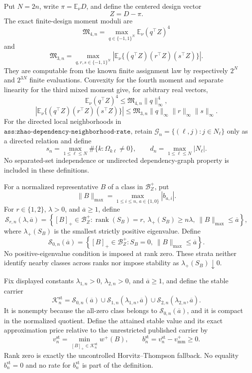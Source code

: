 Put \(N=2n\), write \(\pi=\mathbb E_\nu D\), and define the centered design vector
\[
Z=D-\pi.
\]
The exact finite-design moment moduli are
\[
\mathfrak M_{4,n}
=\max_{q\in\{-1,1\}^{N}}\mathbb E_\nu(q^{\top}Z)^4
\]
and
\[
\mathfrak M_{3,n}
=\max_{q,r,s\in\{-1,1\}^{N}}
\left|\mathbb E_\nu\{(q^{\top}Z)(r^{\top}Z)(s^{\top}Z)\}\right|.
\]
They are computable from the known finite assignment law by respectively \(2^N\) and \(2^{3N}\) finite evaluations.  Convexity for the fourth moment and separate linearity for the third mixed moment give, for arbitrary real vectors,
\[
\mathbb E_\nu(q^{\top}Z)^4
\le\mathfrak M_{4,n}\lVert q\rVert_\infty^4,
\]
\[
\left|\mathbb E_\nu\{(q^{\top}Z)(r^{\top}Z)(s^{\top}Z)\}\right|
\le\mathfrak M_{3,n}\lVert q\rVert_\infty
\lVert r\rVert_\infty\lVert s\rVert_\infty.
\]
For the directed local neighborhoods in \(\texttt{ass:zhao-dependency-neighborhood-rate}\), retain \(\mathcal G_n=\{(\ell,j):j\in N_\ell\}\) only as a directed relation and define
\[
s_n=\max_{1\le \ell\le N}\#\{k:\Omega_{k\ell}\ne0\},
\qquad
d_n=\max_{1\le \ell\le N}\lvert N_\ell\rvert.
\]
No separated-set independence or undirected dependency-graph property is included in these definitions.

For a normalized representative \(B\) of a class in \(\mathcal B_Z^+\), put
\[
\lVert B\rVert_{\max}
=\max_{1\le i\le n,\,a\in\{1,0\}}|b_{a,i}|.
\]
For \(r\in\{1,2\}\), \(\lambda>0\), and \(\overline a\ge1\), define
\[
\mathcal S_{r,n}(\lambda,\overline a)
=\left\{[B]_+\in\mathcal B_Z^+:
\operatorname{rank}(S_B)=r,\ 
\lambda_+(S_B)\ge n\lambda,\ 
\lVert B\rVert_{\max}\le\overline a\right\},
\]
where \(\lambda_+(S_B)\) is the smallest strictly positive eigenvalue.  Define
\[
\mathcal S_{0,n}(\overline a)
=\left\{[B]_+\in\mathcal B_Z^+:S_B=0,\ 
\lVert B\rVert_{\max}\le\overline a\right\}.
\]
No positive-eigenvalue condition is imposed at rank zero.  These strata neither identify nearby classes across ranks nor impose stability as \(\lambda_+(S_B)\downarrow0\).

Fix displayed constants \(\lambda_{1,n}>0\), \(\lambda_{2,n}>0\), and \(\overline a\ge1\), and define the stable carrier
\[
\mathcal K_n^{\mathrm{st}}
=\mathcal S_{0,n}(\overline a)
\cup\mathcal S_{1,n}(\lambda_{1,n},\overline a)
\cup\mathcal S_{2,n}(\lambda_{2,n},\overline a).
\]
It is nonempty because the all-zero class belongs to \(\mathcal S_{0,n}(\overline a)\), and it is compact in the normalized quotient.  Define the attained stable value and its exact approximation price relative to the unrestricted published carrier by
\[
v_n^{\mathrm{st}}
=\min_{[B]_+\in\mathcal K_n^{\mathrm{st}}}w^+(B),
\qquad
b_n^{\mathrm{st}}=v_n^{\mathrm{st}}-v_{\mathrm{mm}}^+\ge0.
\]
Rank zero is exactly the uncontrolled Horvitz--Thompson fallback.  No equality \(b_n^{\mathrm{st}}=0\) and no rate for \(b_n^{\mathrm{st}}\) is part of the definition.